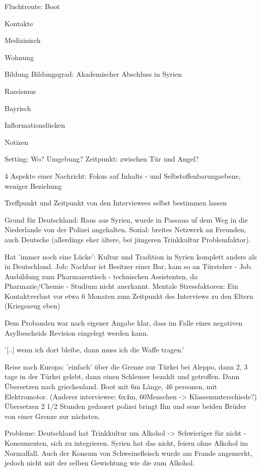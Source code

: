 Fluchtroute: Boot

Kontakte


Medizinisch


Wohnung


Bildung
Bildungsgrad: Akademischer Abschluss in Syrien

Rassismus


Bayrisch


Inflormationslücken


Notizen

Setting: Wo? Umgebung?
Zeitpunkt: zwischen Tür und Angel?

4 Aspekte einer Nachricht: Fokus auf Inhalts - und Selbstoffenbarungsebene, weniger Beziehung

Treffpunkt und Zeitpunkt von den Interviewees selbst bestimmen lassen






Grund für Deutschland: Raus aus Syrien, wurde in Passaua uf dem Weg in die Niederlande von der Polizei angehalten.
Sozial: breites Netzwerk an Freunden, auch Deutsche (allerdings eher ältere, bei jüngeren Trinkkultur Problemfaktor).

Hat 'immer noch eine Lücke': Kultur und Tradition in Syrien komplett anders als in Deutschland.
Job: Nachbar ist Besitzer einer Bar, kam so an Türsteher - Job.
Ausbildung zum Pharmazeutisch - technischen Assistenten, da Pharmazie/Chemie - Studium nicht anerkannt.
Mentale Stressfaktoren:
Ein Kontaktverlust vor etwa 6 Monaten zum Zeitpunkt des Interviews zu den Eltern (Kriegszeug eben)

Dem Probanden war nach eigener Angabe klar, dass im Falle eines negativen Asylbescheids Revision eingelegt werden kann.

'[..] wenn ich dort bleibe, dann muss ich die Waffe tragen.'

Reise nach Europa: 'einfach' über die Grenze zur Türkei bei Aleppo, dann 2, 3 tage in der Türkei gelebt, dann einen Schleuser bezahlt und getroffen. Dann Übersetzen nach griechenland. Boot mit 6m Länge, 46 personen, mit Elektromotor. (Anderer interviewee: 6x4m, 60Menschen -> Klassenunterschiede?)
Übersetzen 2 1/2 Stunden gedauert
polizei bringt Ihn und sene beiden Brüder von einer Grenze zur nächsten. 


Probleme: 
    Deutschland hat Trinkkultur um Alkohol -> Schwieriger für nicht - Konsumenten, sich zu integrieren. Syrien hat das nicht, feiern ohne Alkohol im Normalfall.
    Auch der Konsum von Schweinefleisch wurde am Frande angemerkt, jedoch nicht mit der selben Gewichtung wie die zum Alkohol.
    
